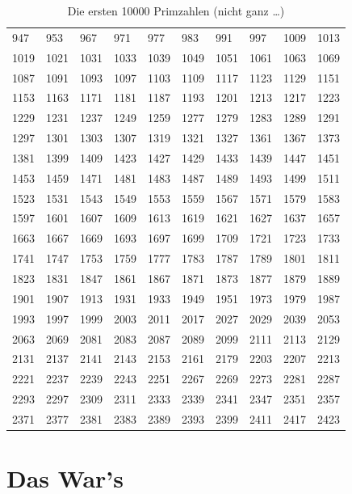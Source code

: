 \documentclass{scrbook}
\begin{document}
\begin{table}[tp]
\begin{tabu}{XXXXXXXXXX}
    947 &  953 &  967 &  971 &  977 &  983 &  991 &  997 & 1009 & 1013 \\
   1019 & 1021 & 1031 & 1033 & 1039 & 1049 & 1051 & 1061 & 1063 & 1069 \\
   1087 & 1091 & 1093 & 1097 & 1103 & 1109 & 1117 & 1123 & 1129 & 1151 \\
   1153 & 1163 & 1171 & 1181 & 1187 & 1193 & 1201 & 1213 & 1217 & 1223 \\
   1229 & 1231 & 1237 & 1249 & 1259 & 1277 & 1279 & 1283 & 1289 & 1291 \\
   1297 & 1301 & 1303 & 1307 & 1319 & 1321 & 1327 & 1361 & 1367 & 1373 \\
   1381 & 1399 & 1409 & 1423 & 1427 & 1429 & 1433 & 1439 & 1447 & 1451 \\
   1453 & 1459 & 1471 & 1481 & 1483 & 1487 & 1489 & 1493 & 1499 & 1511 \\
   1523 & 1531 & 1543 & 1549 & 1553 & 1559 & 1567 & 1571 & 1579 & 1583 \\
   1597 & 1601 & 1607 & 1609 & 1613 & 1619 & 1621 & 1627 & 1637 & 1657 \\
   1663 & 1667 & 1669 & 1693 & 1697 & 1699 & 1709 & 1721 & 1723 & 1733 \\
   1741 & 1747 & 1753 & 1759 & 1777 & 1783 & 1787 & 1789 & 1801 & 1811 \\
   1823 & 1831 & 1847 & 1861 & 1867 & 1871 & 1873 & 1877 & 1879 & 1889 \\
   1901 & 1907 & 1913 & 1931 & 1933 & 1949 & 1951 & 1973 & 1979 & 1987 \\
   1993 & 1997 & 1999 & 2003 & 2011 & 2017 & 2027 & 2029 & 2039 & 2053 \\
   2063 & 2069 & 2081 & 2083 & 2087 & 2089 & 2099 & 2111 & 2113 & 2129 \\
   2131 & 2137 & 2141 & 2143 & 2153 & 2161 & 2179 & 2203 & 2207 & 2213 \\
   2221 & 2237 & 2239 & 2243 & 2251 & 2267 & 2269 & 2273 & 2281 & 2287 \\
   2293 & 2297 & 2309 & 2311 & 2333 & 2339 & 2341 & 2347 & 2351 & 2357 \\
   2371 & 2377 & 2381 & 2383 & 2389 & 2393 & 2399 & 2411 & 2417 & 2423 \\
   \bottomrule
  \end{tabu}
  \caption{Die ersten 10000 Primzahlen (nicht ganz \dots)}
  \label{tab:prime-numbers}
\end{table}

\section{Das War's}
\label{sec:das-wars}
\end{document}

